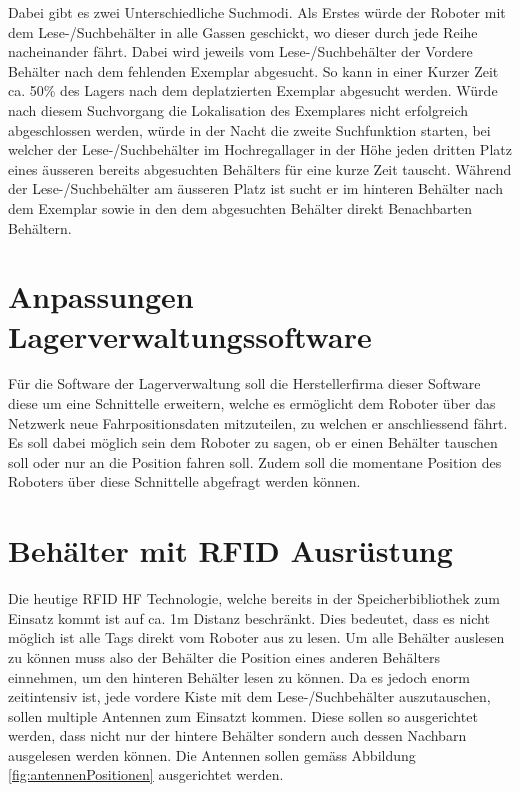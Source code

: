 Dabei gibt es zwei Unterschiedliche Suchmodi. Als Erstes würde der Roboter mit dem Lese-/Suchbehälter in alle Gassen geschickt, wo dieser durch jede Reihe nacheinander fährt. Dabei wird jeweils vom Lese-/Suchbehälter der Vordere Behälter nach dem fehlenden Exemplar abgesucht. So kann in einer Kurzer Zeit ca. 50\% des Lagers nach dem deplatzierten Exemplar abgesucht werden. Würde nach diesem Suchvorgang die Lokalisation des Exemplares nicht erfolgreich abgeschlossen werden, würde in der Nacht die zweite Suchfunktion starten, bei welcher der Lese-/Suchbehälter im Hochregallager in der Höhe jeden dritten Platz eines äusseren bereits abgesuchten Behälters für eine kurze Zeit tauscht. Während der Lese-/Suchbehälter am äusseren Platz ist sucht er im hinteren Behälter nach dem Exemplar sowie in den dem abgesuchten Behälter direkt Benachbarten Behältern.

\section{Anpassungen Lagerverwaltungssoftware}
\label{sec:roboterSWAnpassung}
Für die Software der Lagerverwaltung soll die Herstellerfirma dieser Software diese um eine Schnittelle erweitern, welche es ermöglicht dem Roboter über das Netzwerk neue Fahrpositionsdaten mitzuteilen, zu welchen er anschliessend fährt. Es soll dabei möglich sein dem Roboter zu sagen, ob er einen Behälter tauschen soll oder nur an die Position fahren soll. Zudem soll die momentane Position des Roboters über diese Schnittelle abgefragt werden können. 

\section{Behälter mit RFID Ausrüstung}
\label{sec:behaelterMitRFID}
Die heutige RFID HF Technologie, welche bereits in der Speicherbibliothek zum Einsatz kommt ist auf ca. 1m Distanz beschränkt. Dies bedeutet, dass es nicht möglich ist alle Tags direkt vom Roboter aus zu lesen. Um alle Behälter auslesen zu können muss also der Behälter die Position eines anderen Behälters einnehmen, um den hinteren Behälter lesen zu können. Da es jedoch enorm zeitintensiv ist, jede vordere Kiste mit dem Lese-/Suchbehälter auszutauschen, sollen multiple Antennen zum Einsatzt kommen. Diese sollen so ausgerichtet werden, dass nicht nur der hintere Behälter sondern auch dessen Nachbarn ausgelesen werden können.
Die Antennen sollen gemäss Abbildung \ref{fig:antennenPositionen} ausgerichtet werden.

